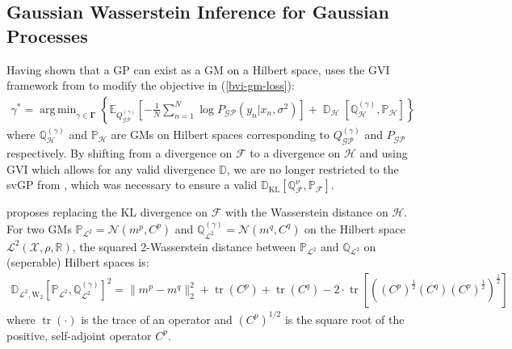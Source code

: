 \documentclass{article}
\newcommand{\KLD}{\operatorname{\mathbb{D}_{\text{KL}}}}
\newcommand{\D}{\operatorname{\mathbb{D}}}
\newcommand{\tr}{\operatorname{tr}}
\newcommand{\GP}{\operatorname{\mathcal{GP}}}
\DeclareMathOperator*{\argmin}{arg\,min}
\numberwithin{equation}{section}
\begin{document}
\subsection{Gaussian Wasserstein Inference for Gaussian Processes}
Having shown that a GP can exist as a GM on a Hilbert space, \cite{wild2022generalized} uses the GVI framework from \cite{knoblauch2022optimization} to modify the objective in (\ref{bvi-gm-loss}):
\begin{align}
    \label{gwi-objective}
    \gamma^* = \argmin_{\gamma \in \boldsymbol{\Gamma}}\left\{ \mathbb{E}_{Q^{(\gamma)}_{\GP}}\left[- \frac{1}{N}\sum_{n=1}^N \log P_{\GP}\left(y_n \vert x_n, \sigma^2\right) \right] + \D_{\mathcal{H}} \left[\mathbb{Q}^{(\gamma)}_{\mathcal{H}}, \mathbb{P}_{\mathcal{H}} \right]\right\}
\end{align}
where $\mathbb{Q}^{(\gamma)}_{\mathcal{H}}$ and $\mathbb{P}_{\mathcal{H}}$ are GMs on Hilbert spaces corresponding to $Q^{(\gamma)}_{\GP}$ and $P_{\GP}$ respectively. By shifting from a divergence on $\mathcal{F}$ to a divergence on $\mathcal{H}$ and using GVI which allows for any valid divergence $\mathbb{D}$, we are no longer restricted to the svGP from \cite{titsias2009variational}, which was necessary to ensure a valid $\KLD\left[\mathbb{Q}^{\nu}_{\mathcal{F}},  \mathbb{P}_{\mathcal{F}}\right]$. 

\cite{wild2022generalized} proposes replacing the KL divergence on $\mathcal{F}$ with the Wasserstein distance on $\mathcal{H}$. For two GMs $\mathbb{P}_{\mathcal{L}^2} = \mathcal{N}(m^p, C^p)$ and $\mathbb{Q}^{(\gamma)}_{\mathcal{L}^2} = \mathcal{N}(m^q, C^q)$ on the Hilbert space $\mathcal{L}^2(\mathcal{X}, \rho, \mathbb{R})$, the squared 2-Wasserstein distance between $\mathbb{P}_{\mathcal{L}^2}$ and $\mathbb{Q}_{\mathcal{L}^2}$ on (seperable) Hilbert spaces is:
\begin{align}
    \label{wasserstein-distance}
    \mathbb{D}_{\mathcal{L}^2, \text{W}_2} \left[\mathbb{P}_{\mathcal{L}^2}, \mathbb{Q}^{(\gamma)}_{\mathcal{L}^2}\right]^2 = \| m^p - m^q\|_2^2 + \tr(C^p) + \tr(C^q) - 2 \cdot \tr \left[ \left( \left(C^p\right)^{\frac{1}{2}} \left(C^q\right) \left(C^p\right)^{\frac{1}{2}}\right)^{\frac{1}{2}}\right]
\end{align}
where $\tr(\cdot)$ is the trace of an operator and $\left(C^p\right)^{1/2}$ is the square root of the positive, self-adjoint operator $C^p$. 
\end{document}

